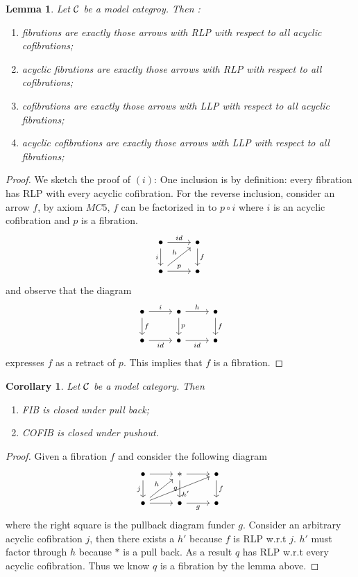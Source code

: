 \documentclass[11pt]{article}
\newtheorem{lemma}[thm]{Lemma}
\newtheorem{cor}[thm]{Corollary}
\newcommand{\calc}{{\cal C}}
\begin{document}
\begin{lemma}
Let $\calc$ be a model categroy. Then :
\begin{enumerate}[label=(\roman*)]
\item fibrations are exactly those arrows with RLP with respect to all acyclic cofibrations;
\item acyclic fibrations are exactly those arrows with RLP with respect to all cofibrations;
\item  cofibrations are exactly those arrows with LLP with respect to all acyclic fibrations;
\item acyclic cofibrations are exactly those arrows with LLP with respect to all fibrations;
 \end{enumerate}
\end{lemma}
\begin{proof}
We sketch the proof of $(i)$: One inclusion is by definition: every fibration has RLP with every acyclic cofibration. For the reverse inclusion, consider an arrow $f$, by axiom $MC5$, $f$ can be factorized in to $p\circ i$ where $i$ is an acyclic cofibration and $p$ is a fibration. 
$$
\begin{tikzcd}
\bullet \arrow[d, "i"'] \arrow[r, "id"] & \bullet \arrow[d, "f"] \\
\bullet \arrow[r, "p"] \arrow[ru, "h"] & \bullet
\end{tikzcd}
$$
and observe that the diagram 
$$
\begin{tikzcd}
\bullet \arrow[r, "i"] \arrow[d, "f"] & \bullet \arrow[r, "h"] \arrow[d, "p"] & \bullet \arrow[d, "f"] \\
\bullet \arrow[r, "id"'] & \bullet \arrow[r, "id"'] & \bullet
\end{tikzcd}
$$
expresses $f$ as a retract of $p$. This implies that $f$ is a fibration.
\end{proof}

\begin{cor}
Let $\calc$ be a model category. Then 
\begin{enumerate}[label=(\roman*)]
\item FIB is closed under pull back;
\item COFIB is closed under pushout.
\end{enumerate}
\end{cor}
\begin{proof}
Given a fibration $f$ and consider the following diagram
$$
\begin{tikzcd}
\bullet \arrow[d, "j"'] \arrow[r] & * \arrow[r] \arrow[d, "q"'] & \bullet \arrow[d, "f"] \\
\bullet \arrow[r] \arrow[rru, "h'"'] \arrow[ru, "h"] & \bullet \arrow[r, "g"'] & \bullet
\end{tikzcd}
$$
where the right square is the pullback diagram funder $g$. Consider an arbitrary acyclic cofibration $j$, then there exists a $h'$ because $f$ is RLP w.r.t $j$. $h'$ must factor through $h$ because $*$ is a pull back. As a result $q$ has RLP w.r.t every acyclic cofibration. Thus we know $q$ is a fibration by the lemma above.
\end{proof}
\end{document}
